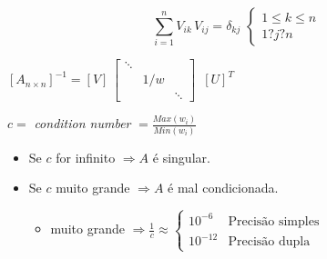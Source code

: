 \[
 \displaystyle \sum_{i=1}^n V_{ik} \, V_{ij} = \delta_{kj}  \, \,
 \left\{
 \begin{array}{l}
   1 \leq k \leq n\\
   1 ? j ? n
 \end{array}
 \right.
\]

{
 \Large{
 \begin{center}
 $
  [A_{n \times n}]^{-1} = [V] \, ${\footnotesize{$
 \left[
 \begin{array}{ccc}
   \ddots & &\\
   & 1/w &\\
   & & \ddots
 \end{array}
 \right]
 $
 }}
 $
 \, [U]^T
 $
 \end{center}
}
}

$c = $ \textit{condition number} $ = \displaystyle \frac{Max(w_i)}{Min(w_i)}$

\begin{itemize}

\item Se $c$ for infinito $ \Rightarrow A$ é singular.

\item Se $c$ muito grande $ \Rightarrow A$ é mal condicionada.

\begin{itemize}

\item muito grande $ \Rightarrow \displaystyle \frac{1}{c} \approx
\left\{
\begin{array}{ll}
 10^{-6} & \mbox{Precisão simples}\\
 10^{-12} & \mbox{Precisão dupla}
\end{array}
\right.
$

\end{itemize}

\end{itemize}
